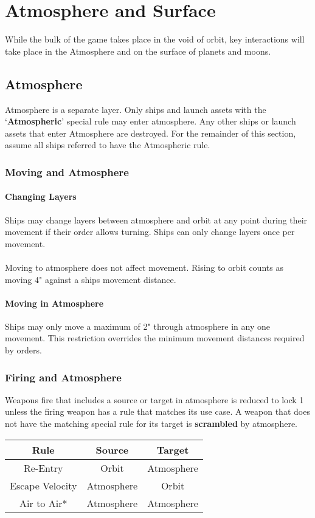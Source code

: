 \chapter{Atmosphere and Surface}

While the bulk of the game takes place in the void of orbit, key interactions will take place in the Atmosphere and on the surface of planets and moons.

\section{Atmosphere}
Atmosphere is a separate layer. Only ships and launch assets with the `\textbf{Atmospheric}' special rule may enter atmosphere. Any other ships or launch assets that enter Atmosphere are destroyed. For the remainder of this section, assume all ships referred to have the Atmospheric rule.


\subsection{Moving and Atmosphere}
\subsubsection{Changing Layers}
Ships may change layers between atmosphere and orbit at any point during their movement if their order allows turning. Ships can only change layers once per movement.
\\\\
Moving to atmosphere does not affect movement. Rising to orbit counts as moving 4" against a ships movement distance.

\subsubsection{Moving in Atmosphere}
Ships may only move a maximum of 2" through atmosphere in any one movement. This restriction overrides the minimum movement distances required by orders.

\subsection{Firing and Atmosphere} \label{sec:AtmosphereShooting}
Weapons fire that includes a source or target in atmosphere is reduced to lock 1 unless the firing weapon has a rule that matches its use case. A weapon that does not have the matching special rule for its target is \textbf{scrambled} by atmosphere.
\begin{center}
\begin{tabular}{|c|c|c|}
	\hline
	\textbf{Rule} & \textbf{Source} & \textbf{Target} \\
	\hline
	Re-Entry & Orbit & Atmosphere \\
	\gray Escape Velocity & Atmosphere & Orbit \\
	Air to Air* & Atmosphere & Atmosphere \\
	\hline
\end{tabular}
\end{center}

